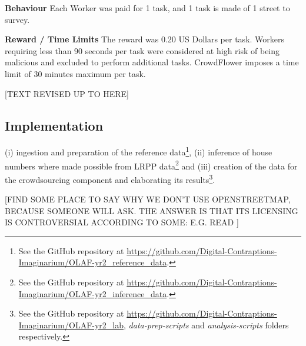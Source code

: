 \textbf{Behaviour} Each Worker was paid for 1 task, and 1 task is made of 1 street to survey.

\textbf{Reward / Time Limits} The reward was 0.20 US Dollars per task. Workers requiring less than 90 seconds per task were considered at high risk of being malicious and excluded to perform additional tasks. CrowdFlower imposes a time limit of 30 minutes maximum per task.

[TEXT REVISED UP TO HERE]

\subsection{Implementation}

(i) ingestion and preparation of the reference data\footnote{See the GitHub repository at \url{https://github.com/Digital-Contraptions-Imaginarium/OLAF-yr2_reference_data}.}, (ii) inference of house numbers where made possible from LRPP data\footnote{See the GitHub repository at \url{https://github.com/Digital-Contraptions-Imaginarium/OLAF-yr2_inference_data}.} and (iii) creation of the data for the crowdsourcing component and elaborating its results\footnote{See the GitHub repository at \url{https://github.com/Digital-Contraptions-Imaginarium/OLAF-yr2_lab}, {\it data-prep-scripts} and {\it analysis-scripts} folders respectively.}. 

[FIND SOME PLACE TO SAY WHY WE DON'T USE OPENSTREETMAP, BECAUSE SOMEONE WILL ASK. THE ANSWER IS THAT ITS LICENSING IS CONTROVERSIAL ACCORDING TO SOME: E.G. READ \cite{CentreforSpatialLawandPolicy:2014tx}]
    

